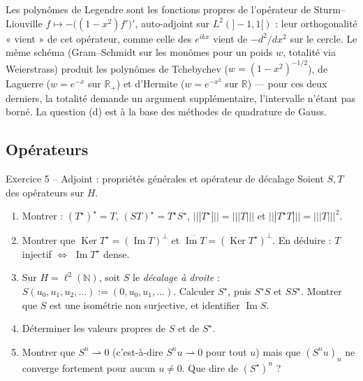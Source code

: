 \documentclass[11pt,a4paper]{article}
\newcommand{\R}{\mathbb{R}}
\newcommand{\N}{\mathbb{N}}
\newcommand{\adh}[1]{\overline{#1}}
\newcommand{\opnorm}[1]{|\!|\!|#1|\!|\!|}
\newcommand{\ie}{c'est-à-dire}
\DeclareMathOperator{\Ker}{Ker}
\DeclareMathOperator{\Ima}{Im}
\theoremstyle{definition}
\begin{document}
\begin{commentaire}
Les polynômes de Legendre sont les fonctions propres de l'opérateur de Sturm--Liouville $f\mapsto-\big((1-x^2)f'\big)'$, auto-adjoint sur $L^2(]-1,1[)$ : leur orthogonalité « vient » de cet opérateur, comme celle des $e^{ikx}$ vient de $-d^2/dx^2$ sur le cercle. Le même schéma (Gram--Schmidt sur les monômes pour un poids $w$, totalité via Weierstrass) produit les polynômes de Tchebychev ($w=(1-x^2)^{-1/2}$), de Laguerre ($w=e^{-x}$ sur $\R_+$) et d'Hermite ($w=e^{-x^2}$ sur $\R$) — pour ces deux derniers, la totalité demande un argument supplémentaire, l'intervalle n'étant pas borné. La question (d) est à la base des méthodes de quadrature de Gauss.
\end{commentaire}

\subsection*{Opérateurs}

\begin{exo}{Exercice 5 -- Adjoint : propriétés générales et opérateur de décalage}
Soient $S,T$ des opérateurs sur $H$.
\begin{enumerate}[label=(\alph*)]
  \item Montrer : $(T^\star)^\star=T$, $(ST)^\star=T^\star S^\star$, $\opnorm{T^\star}=\opnorm T$ et $\opnorm{T^\star T}=\opnorm T^2$.
  \item Montrer que $\Ker T^\star=(\Ima T)^\perp$ et $\adh{\Ima T}=(\Ker T^\star)^\perp$. En déduire : $T$ injectif $\iff$ $\Ima T^\star$ dense.
  \item Sur $H=\ell^2(\N)$, soit $S$ le \emph{décalage à droite} : $S(u_0,u_1,u_2,\dots):=(0,u_0,u_1,\dots)$. Calculer $S^\star$, puis $S^\star S$ et $SS^\star$. Montrer que $S$ est une isométrie non surjective, et identifier $\Ima S$.
  \item Déterminer les valeurs propres de $S$ et de $S^\star$.
  \item Montrer que $S^n\rightharpoonup0$ (\ie{} $S^nu\rightharpoonup0$ pour tout $u$) mais que $(S^nu)_n$ ne converge fortement pour aucun $u\ne0$. Que dire de $(S^\star)^n$ ?
\end{enumerate}
\end{exo}
\end{document}
